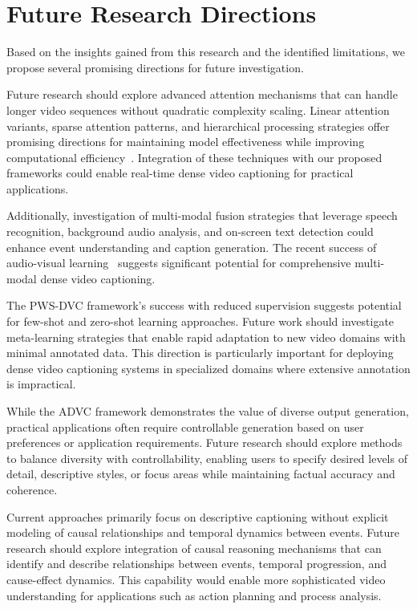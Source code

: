 \section{Future Research Directions}
\label{sec:future_directions}

Based on the insights gained from this research and the identified limitations, we propose several promising directions for future investigation.

Future research should explore advanced attention mechanisms that can handle longer video sequences without quadratic complexity scaling. Linear attention variants, sparse attention patterns, and hierarchical processing strategies offer promising directions for maintaining model effectiveness while improving computational efficiency~\cite{tay2022efficient}. Integration of these techniques with our proposed frameworks could enable real-time dense video captioning for practical applications.

Additionally, investigation of multi-modal fusion strategies that leverage speech recognition, background audio analysis, and on-screen text detection could enhance event understanding and caption generation. The recent success of audio-visual learning~\cite{Akbari2021-ih} suggests significant potential for comprehensive multi-modal dense video captioning.

The PWS-DVC framework's success with reduced supervision suggests potential for few-shot and zero-shot learning approaches. Future work should investigate meta-learning strategies that enable rapid adaptation to new video domains with minimal annotated data. This direction is particularly important for deploying dense video captioning systems in specialized domains where extensive annotation is impractical.

While the ADVC framework demonstrates the value of diverse output generation, practical applications often require controllable generation based on user preferences or application requirements. Future research should explore methods to balance diversity with controllability, enabling users to specify desired levels of detail, descriptive styles, or focus areas while maintaining factual accuracy and coherence.

Current approaches primarily focus on descriptive captioning without explicit modeling of causal relationships and temporal dynamics between events. Future research should explore integration of causal reasoning mechanisms that can identify and describe relationships between events, temporal progression, and cause-effect dynamics. This capability would enable more sophisticated video understanding for applications such as action planning and process analysis.

